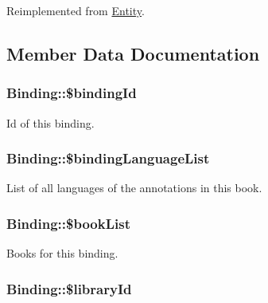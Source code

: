 Reimplemented from \hyperlink{classEntity_a48cdc3830bf695078a69a56f23e1b874}{Entity}.



\subsection{Member Data Documentation}
\hypertarget{classBinding_ac145987d9c0aca2442c63a92a085ef03}{
\subsubsection[{\$bindingId}]{\setlength{\rightskip}{0pt plus 5cm}Binding::\$bindingId}}
\label{classBinding_ac145987d9c0aca2442c63a92a085ef03}
Id of this binding. \hypertarget{classBinding_a9ef17d4d6732c18b6a3ac4b48483ef90}{
\subsubsection[{\$bindingLanguageList}]{\setlength{\rightskip}{0pt plus 5cm}Binding::\$bindingLanguageList}}
\label{classBinding_a9ef17d4d6732c18b6a3ac4b48483ef90}
List of all languages of the annotations in this book. \hypertarget{classBinding_abf327f008d27256a4756e6e08819d87b}{
\subsubsection[{\$bookList}]{\setlength{\rightskip}{0pt plus 5cm}Binding::\$bookList}}
\label{classBinding_abf327f008d27256a4756e6e08819d87b}
Books for this binding. \hypertarget{classBinding_a9e88a985a9d2097135f01ef49a1c3114}{
\subsubsection[{\$libraryId}]{\setlength{\rightskip}{0pt plus 5cm}Binding::\$libraryId}}
